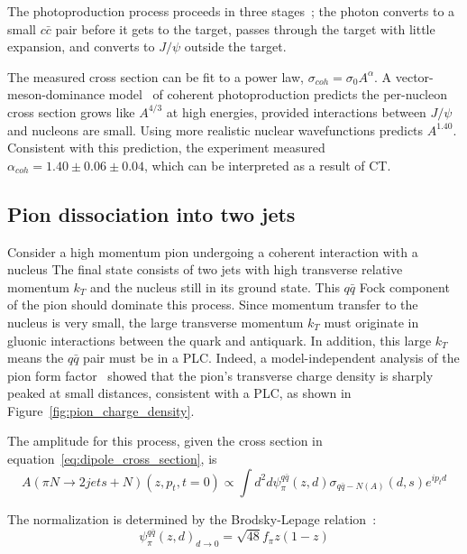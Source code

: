 The photoproduction process proceeds in three stages~\cite{Brodsky_1994};
the photon converts to a small $c\bar{c}$ pair before it gets to the target,
passes through the target with little expansion,
and converts to $J/\psi$ outside the target.


The measured cross section can be fit to a power law, $\sigma_{coh} =
\sigma_0 A^\alpha$.
A vector-meson-dominance model~\cite{Bauer_1978} of coherent photoproduction
predicts the per-nucleon cross section grows like $A^{4/3}$ at high energies,
provided interactions between $J/\psi$ and nucleons are small.
Using more realistic nuclear wavefunctions predicts $A^{1.40}$.
Consistent with this prediction, the experiment measured
$\alpha_{coh} = 1.40 \pm 0.06 \pm 0.04$, which can be interpreted as a result
of CT.


\subsection{Pion dissociation into two jets}
Consider a high momentum pion undergoing a coherent interaction with a nucleus
The final state consists of two jets with high transverse relative momentum
$k_T$ and the nucleus still in its ground state.
This $q\bar{q}$ Fock component of the pion should dominate this process.
Since momentum transfer to the nucleus is very small, the large transverse
momentum $k_T$ must originate in gluonic interactions between the quark and
antiquark.
In addition, this large $k_T$ means the $q\bar{q}$ pair must be in a PLC.
Indeed, a model-independent analysis of the pion form factor~\cite{Miller_2011}
showed that the pion's transverse charge density is sharply peaked at small
distances, consistent with a PLC, as shown in
Figure~\ref{fig:pion_charge_density}.


The amplitude for this process, given the cross section in
equation~\ref{eq:dipole_cross_section}, is
\begin{equation}
    A(\pi N \rightarrow 2 j e t s+N)\left(z, p_{t}, t=0\right) \propto
    \int d^{2} d \psi_{\pi}^{q\bar{q}}(z,d) \sigma_{q\bar{q}-N(A)}(d,s) e^{i p_t d}
\end{equation}


The normalization is determined by the Brodsky-Lepage relation~\cite{Lepage_1980}:
\begin{equation}
    \psi_\pi^{q\bar{q}}{\left(z,d\right)}_{d\rightarrow0} = \sqrt{48} f_\pi z (1-z)
\end{equation}


